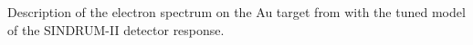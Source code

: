 \vspace{0.2in}
%
 {
  \label{fig:ana_step1_best_dio_fit}
  Description of the electron spectrum on the Au target from \cite{sindrum_ii:Bertl2006}
  with the tuned model of the SINDRUM-II detector response.
}
